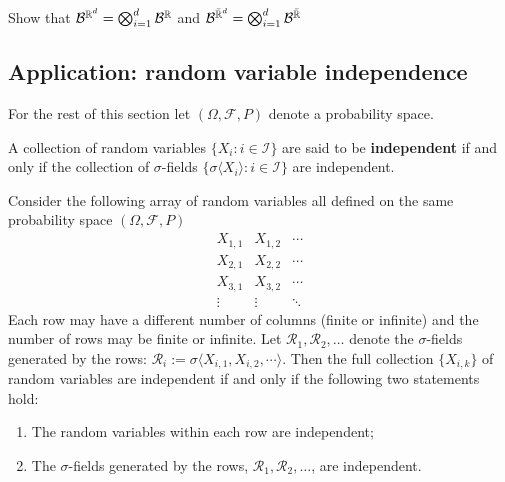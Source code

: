 \begin{exercise} Show that
$\mathcal B^{{\Bbb R}^d}= \bigotimes_{i=1}^d \mathcal B^{{\Bbb R}}$ and $\mathcal B^{\bar{\Bbb R}^d}= \bigotimes_{i=1}^d \mathcal B^{\bar{\Bbb R}}$
\end{exercise}




%
%
\subsection{Application: random variable independence}




\begin{sectionassumption} For the rest of this section let $(\Omega, \mathcal F, P)$ denote a probability space.
\end{sectionassumption}





\begin{definition}
A collection of random variables $\{X_i: i\in\mathcal I\}$ are said to be {\bf independent} if and only if the collection of $\sigma$-fields $\{\sigma\langle X_i\rangle\colon i\in\mathcal I \}$ are independent.
\end{definition}




\begin{theorem}
Consider the following array of random variables all defined on the same probability space $(\Omega, \mathcal F, P)$
\[
\begin{array}{ccc}
 X_{1,1} &  X_{1,2} & \cdots \\
 X_{2,1} & X_{2,2} & \cdots \\
 X_{3,1} & X_{3,2} & \cdots \\
\vdots & \vdots & \ddots
\end{array}
\]
Each row may have a different number of columns (finite or infinite) and the number of rows may be finite or infinite.
Let $\mathscr R_1,\mathscr R_2,\ldots$ denote the $\sigma$-fields generated by the rows: $\mathscr R_i:=\sigma\langle X_{i,1}, X_{i,2} , \cdots \rangle $.
 Then the full collection  $\{ X_{i,k} \}$ of random variables are independent  if and only if the following two statements hold:
\begin{enumerate}
\item The random variables within each row are independent;
\item The  $\sigma$-fields generated by the rows, $\mathscr R_1,\mathscr R_2,\ldots$, are independent.
\end{enumerate}
\end{theorem}


